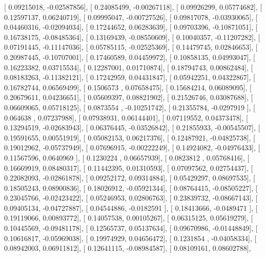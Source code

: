\documentclass{article}
\begin{document}
       [ 0.09215018, -0.02587856],
       [ 0.24085499, -0.00267118],
       [ 0.09926299,  0.05774682],
       [ 0.12597137,  0.06240719],
       [ 0.09995047, -0.00727526],
       [ 0.09817078, -0.03930065],
       [ 0.04460316, -0.02094034],
       [ 0.17244652,  0.06283639],
       [ 0.09703396, -0.10871051],
       [ 0.16738175, -0.08485364],
       [ 0.13169439, -0.08550609],
       [ 0.10040357, -0.11207282],
       [ 0.07191445, -0.11147036],
       [ 0.05785115, -0.02525369],
       [ 0.14479745,  0.02846653],
       [ 0.20987445, -0.10707001],
       [ 0.17460589,  0.04459972],
       [ 0.10858135,  0.04993047],
       [ 0.16223382,  0.03715534],
       [ 0.12287001,  0.01710874],
       [ 0.18794743,  0.00862484],
       [ 0.08183263, -0.11382121],
       [ 0.17242959,  0.04431847],
       [ 0.05942251,  0.04322867],
       [ 0.16782744,  0.06569499],
       [ 0.1506573 ,  0.07658475],
       [ 0.15684214,  0.06089095],
       [ 0.20679611,  0.04236651],
       [ 0.05609397,  0.08821902],
       [ 0.21526746,  0.03087688],
       [ 0.06609065,  0.05718125],
       [ 0.0873554 , -0.10251742],
       [ 0.21355784, -0.0297919 ],
       [ 0.064638  ,  0.07237988],
       [ 0.07938931,  0.06144401],
       [ 0.07119552,  0.04373478],
       [ 0.13294519, -0.02683943],
       [ 0.06376445, -0.03526842],
       [ 0.21855933, -0.00545507],
       [ 0.19591655,  0.00551919],
       [ 0.05082153,  0.06217376],
       [ 0.12487921, -0.04825738],
       [ 0.19012962, -0.05737949],
       [ 0.07696915, -0.00222249],
       [ 0.14924082, -0.04976433],
       [ 0.11567596,  0.0640969 ],
       [ 0.1230224 ,  0.06657939],
       [ 0.0823812 ,  0.05768416],
       [ 0.16669919,  0.08480317],
       [ 0.11442395,  0.01310593],
       [ 0.07097562,  0.02754437],
       [ 0.22082093, -0.02861878],
       [ 0.09252172,  0.09314884],
       [ 0.05429297,  0.08697535],
       [ 0.18505243,  0.08900836],
       [ 0.18026912, -0.05921344],
       [ 0.08764415, -0.08505227],
       [ 0.23045766, -0.02423422],
       [ 0.05246953,  0.02806763],
       [ 0.23839732, -0.08667143],
       [ 0.09405134, -0.04727887],
       [ 0.04544886, -0.0182591 ],
       [ 0.18413666, -0.0489471 ],
       [ 0.19119066,  0.00893772],
       [ 0.14057538,  0.00105267],
       [ 0.06315125,  0.05619279],
       [ 0.10445569, -0.09481178],
       [ 0.12565737,  0.05137634],
       [ 0.09670986, -0.01448849],
       [ 0.10616817, -0.05969038],
       [ 0.19974929,  0.04656472],
       [ 0.1231854 , -0.04058334],
       [ 0.08942003,  0.06911812],
       [ 0.12641115, -0.08984587],
       [ 0.08109161,  0.08602788],
\end{document}
